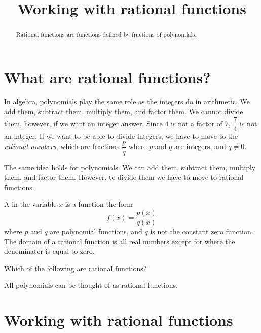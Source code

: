 \documentclass{ximera}
\title[Dig-In:]{Working with rational functions}
\begin{document}
\begin{abstract}
  Rational functions are functions defined by fractions of
  polynomials.
\end{abstract}
\maketitle


\section{What are rational functions?}
In algebra, polynomials play the same role as the integers do in arithmetic.  We add them, subtract them, multiply them, and factor them.  We cannot 
divide them, however, if we want an integer answer.  Since $4$ is not a factor of $7$, $\dfrac{7}{4}$ is not an integer.  If we want to be able to divide
integers, we have to move to the \emph{rational numbers}, which are fractions $\dfrac{p}{q}$ where $p$ and $q$ are integers, and $q \ne 0$.

The same idea holds for polynomials.  We can add them, subtract them, multiply them, and factor them.  However, to divide them we have to move
to rational functions.

\begin{definition}
  A  in the variable $x$ is a function the form
  \[
  f(x) = \frac{p(x)}{q(x)}
  \]
  where $p$ and $q$ are polynomial functions, and $q$ is not the constant zero function. The domain of a rational
  function is all real numbers except for where the denominator is
  equal to zero.
\end{definition}

\begin{question}
  Which of the following are rational functions?
  \begin{selectAll}
  \end{selectAll}
  \begin{feedback}
    All polynomials can be thought of as rational functions.
  \end{feedback}
\end{question}



\section{Working with rational functions}
\end{document}
